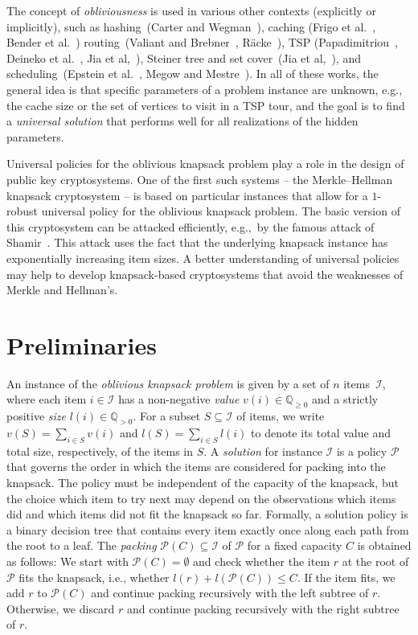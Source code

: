 \documentclass[11pt]{article}
\newcommand{\I}{\mathcal{I}}
\begin{document}
The concept of \emph{obliviousness }is used in various other contexts
(explicitly or implicitly), such as hashing~(Carter and Wegman~\cite{carterW79}),
caching (Frigo et al.~\cite{frigoLPR99}, Bender et al.~\cite{benderCD02})
routing~(Valiant and Brebner~\cite{valiantB81}, Räcke~\cite{raecke09}),
TSP (Papadimitriou~\cite{papadimitriou94}, Deineko et al.~\cite{deinekoRW95},
Jia et al,~\cite{jiaLNRS05}), Steiner tree and set cover~(Jia et
al,~\cite{jiaLNRS05}), and scheduling~(Epstein et al.~\cite{epsteinLMMMSS12},
Megow and Mestre~\cite{megowM13}). In all of these works, the general
idea is that specific parameters of a problem instance are unknown,
e.g., the cache size or the set of vertices to visit in a TSP tour,
and the goal is to find a \emph{universal solution }that performs
well for all realizations of the hidden parameters.

Universal policies for the oblivious knapsack problem play a role
in the design of public key cryptosystems. One of the first such systems
-- the Merkle–Hellman knapsack cryptosystem \cite{merkleH78} -- is
based on particular instances that allow for a $1$-robust universal
policy for the oblivious knapsack problem. The basic version of this
cryptosystem can be attacked efficiently, e.g.,~by the famous attack
of Shamir~\cite{shamir82}. This attack uses the fact that the underlying
knapsack instance has exponentially increasing item sizes. A better
understanding of universal policies may help to develop knapsack-based
cryptosystems that avoid the weaknesses of Merkle and Hellman's.


\section{Preliminaries}

An instance of the \emph{oblivious knapsack problem} is given by a
set of $n$ items~$\mathcal{I}$, where each item $i\in\mathcal{I}$
has a non-negative \emph{value} $v(i)\in\mathbb{Q}_{\geq0}$ and a
strictly positive \emph{size} $l(i)\in\mathbb{Q}_{>0}$. For a subset
$S\subseteq\I$ of items, we write $v(S)=\sum_{i\in S}v(i)$ and $l(S)=\sum_{i\in S}l(i)$
to denote its total value and total size, respectively, of the items
in $S$. A \emph{solution} for instance $\mathcal{I}$ is a policy
$\mathscr{P}$ that governs the order in which the items are considered
for packing into the knapsack. The policy must be independent of the
capacity of the knapsack, but the choice which item to try next may
depend on the observations which items did and which items did not
fit the knapsack so far. Formally, a solution policy is a binary decision
tree that contains every item exactly once along each path from the
root to a leaf. The \emph{packing} $\mathscr{P}(C)\subseteq\I$ of
$\mathscr{P}$ for a fixed capacity $C$ is obtained as follows: We
start with $\mathscr{P}(C)=\emptyset$ and check whether the item
$r$ at the root of $\mathscr{P}$ fits the knapsack, i.e., whether
$l(r)+l(\mathscr{P}(C))\leq C$. If the item fits, we add $r$ to
$ $$\mathscr{P}(C)$ and continue packing recursively with the left
subtree of $r$. Otherwise, we discard $r$ and continue packing recursively
with the right subtree of $r$.
\end{document}
